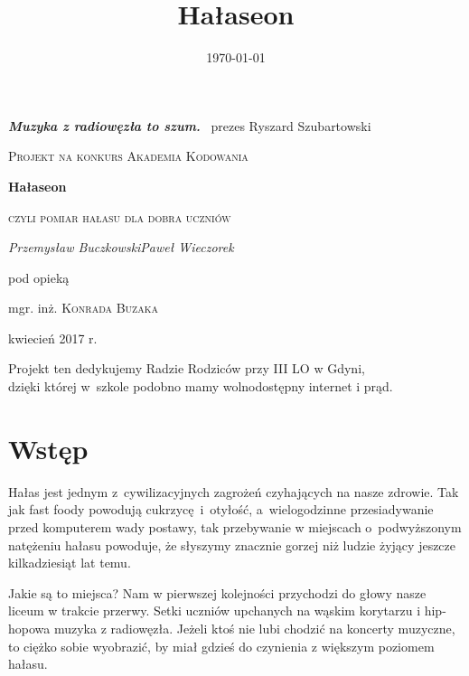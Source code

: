 \documentclass[12pt, a4paper]{article}
\title{Hałaseon}
\date{\today}
\begin{document}
\begin{titlepage}
	\begin{flushright}
	{\large \color{Goldenrod} \emph{\textbf{Muzyka z radiowęzła to szum.}} \linebreak}
	~prezes Ryszard Szubartowski
	\end{flushright}
	\centering
	\vspace{1.5 cm}
	{\scshape Projekt na konkurs Akademia Kodowania\par}
	\vspace{1.5 cm}
	{\huge\bfseries Hałaseon\par}
	\vspace{0.1cm}
	{\scshape\Large czyli pomiar hałasu dla dobra uczniów\par}
	\vspace{2cm}
	{\Large\itshape Przemysław Buczkowski\linebreak Paweł Wieczorek\par}
	\vfill
	pod opieką\par
	mgr. inż. \textsc{Konrada Buzaka}

	\vfill

	{\large kwiecień 2017 r.\par}
\end{titlepage}

\tableofcontents

\vfill

\begin{flushright}
Projekt ten dedykujemy Radzie Rodziców przy III LO w Gdyni,\\dzięki której w~szkole podobno mamy wolnodostępny internet i prąd.
\end{flushright}

\pagebreak

\section{Wstęp}

Hałas jest jednym z~cywilizacyjnych zagrożeń czyhających na nasze zdrowie. Tak jak fast foody powodują cukrzycę~i~otyłość, a~wielogodzinne przesiadywanie przed komputerem wady postawy, tak przebywanie w miejscach o~podwyższonym natężeniu hałasu powoduje, że słyszymy znacznie gorzej niż ludzie żyjący jeszcze kilkadziesiąt lat temu.

Jakie są to miejsca? Nam w pierwszej kolejności przychodzi do głowy nasze liceum w trakcie przerwy. Setki uczniów upchanych na wąskim korytarzu i hip-hopowa muzyka z radiowęzła. Jeżeli ktoś nie lubi chodzić na koncerty muzyczne, to ciężko sobie wyobrazić, by miał gdzieś do czynienia z większym poziomem hałasu.
\end{document}
